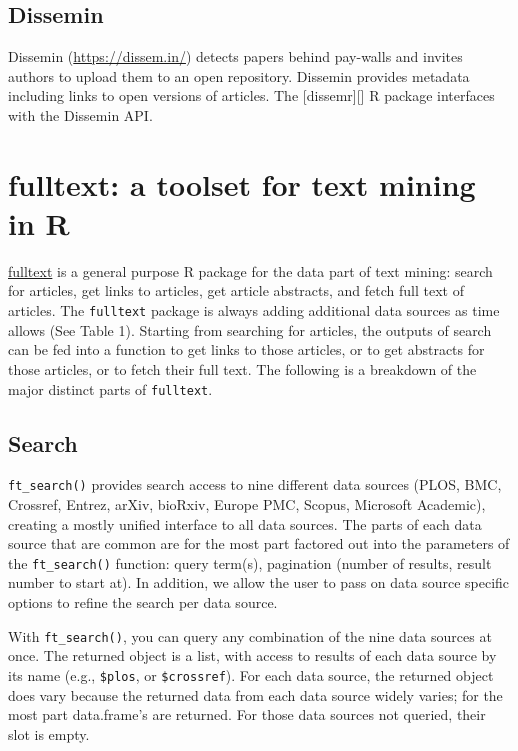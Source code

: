 \documentclass[author-year, review, 11pt]{components/elsarticle} %
\begin{document}
\hypertarget{dissemin}{%
\subsection{Dissemin}\label{dissemin}}

Dissemin (\url{https://dissem.in/}) detects papers behind pay-walls and
invites authors to upload them to an open repository. Dissemin provides
metadata including links to open versions of articles. The
{[}dissemr{]}{[}{]} R package interfaces with the Dissemin API.

\hypertarget{fulltext-a-toolset-for-text-mining-in-r}{%
\section{fulltext: a toolset for text mining in
R}\label{fulltext-a-toolset-for-text-mining-in-r}}

\href{https://github.com/ropensci/fulltext}{fulltext} is a general
purpose R package for the data part of text mining: search for articles,
get links to articles, get article abstracts, and fetch full text of
articles. The \texttt{fulltext} package is always adding additional data
sources as time allows (See Table 1). Starting from searching for
articles, the outputs of search can be fed into a function to get links
to those articles, or to get abstracts for those articles, or to fetch
their full text. The following is a breakdown of the major distinct
parts of \texttt{fulltext}.

\hypertarget{search}{%
\subsection{Search}\label{search}}

\texttt{ft\_search()} provides search access to nine different data
sources (PLOS, BMC, Crossref, Entrez, arXiv, bioRxiv, Europe PMC,
Scopus, Microsoft Academic), creating a mostly unified interface to all
data sources. The parts of each data source that are common are for the
most part factored out into the parameters of the \texttt{ft\_search()}
function: query term(s), pagination (number of results, result number to
start at). In addition, we allow the user to pass on data source
specific options to refine the search per data source.

With \texttt{ft\_search()}, you can query any combination of the nine
data sources at once. The returned object is a list, with access to
results of each data source by its name (e.g., \texttt{\$plos}, or
\texttt{\$crossref}). For each data source, the returned object does
vary because the returned data from each data source widely varies; for
the most part data.frame's are returned. For those data sources not
queried, their slot is empty.
\end{document}
